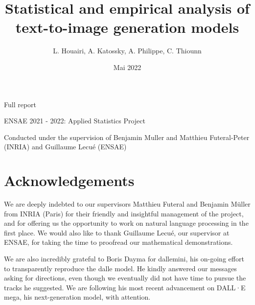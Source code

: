\documentclass{article}
\title{Statistical and empirical analysis of text-to-image generation models}
\author{L. Houairi,
A. Katossky,
A. Philippe,
C. Thiounn }
\date{Mai 2022}
\begin{document}
\begin{titlepage}
\maketitle
\begin{center}
Full report

ENSAE 2021 - 2022: Applied Statistics Project

\vspace{5mm}

Conducted under the supervision of Benjamin Muller and Matthieu Futeral-Peter (INRIA) and Guillaume Lecué (ENSAE)
\end{center}
\end{titlepage}

\renewcommand*\contentsname{Table of Contents}
\tableofcontents

\setlength\parskip{0.2 em} %

\pagebreak
{} %
\section*{Acknowledgements} 

\begin{multicols}{2}

We are deeply indebted to our supervisors Matthieu Futeral and Benjamin Müller from INRIA (Paris) for their friendly and insightful management of the project, and for offering us the opportunity to work on natural language processing in the first place. We would also like to thank Guillaume Lecué, our supervisor at ENSAE, for taking the time to proofread our mathematical demonstrations.

We are also incredibly grateful to Boris Dayma for \gls{dallemini}, his on-going effort to transparently reproduce the \gls{dalle} model. He kindly answered our messages asking for directions, even though we eventually did not have time to pursue the tracks he suggested. We are following his most recent advancement on DALL·E mega, his next-generation model, with attention.

\end{multicols}

\pagebreak

\printglossary[title=Glossary and abbreviations]

\clearpage
\end{document}
